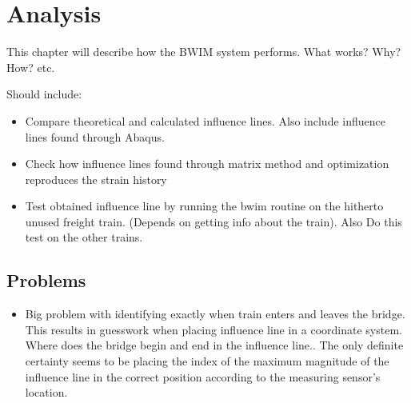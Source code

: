 \section{Analysis}

This chapter will describe how the BWIM system performs. What works? Why? How? etc.

Should include:
\begin{itemize}
\item Compare theoretical and calculated influence lines. Also include influence lines found through Abaqus.
\item Check how influence lines found through matrix method and optimization reproduces the strain history
\item Test obtained influence line by running the bwim routine on the hitherto unused freight train. (Depends on getting info about the train). Also Do this test on the other trains.
\end{itemize}


\subsection{Problems}
\begin{itemize}
\item Big problem with identifying exactly when train enters and leaves the bridge. This results in guesswork when placing influence line in a coordinate system. Where does the bridge begin and end in the influence line.. The only definite certainty seems to be placing the index of the maximum magnitude of the influence line in the correct position according to the measuring sensor's location. 
\end{itemize}